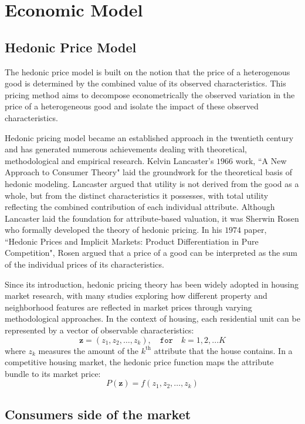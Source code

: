 \section*{Economic Model}
\subsection*{Hedonic Price Model}
The hedonic price model is built on the notion that the price of a heterogenous good is determined by the combined value of its observed characteristics. This pricing method aims to decompose econometrically the observed variation in the price of a heterogeneous good and isolate the impact of these observed characteristics.

Hedonic pricing model became an established approach in the twentieth century and has generated numerous achievements dealing with theoretical, methodological and empirical research. Kelvin Lancaster’s $1966$ work, ``A New Approach to Consumer Theory" laid the groundwork for the theoretical basis of hedonic modeling. Lancaster argued that utility is not derived from the good as a whole, but from the distinct characteristics it possesses, with total utility reflecting the combined contribution of each individual attribute. Although Lancaster laid the foundation for attribute-based valuation, it was Sherwin Rosen who formally developed the theory of hedonic pricing. In his $1974$ paper, ``Hedonic Prices and Implicit Markets: Product Differentiation in Pure Competition", Rosen argued that a price of a good can be interpreted as the sum of the individual prices of its characteristics. 

Since its introduction, hedonic pricing theory has been widely adopted in housing market research, with many studies exploring how different property and neighborhood features are reflected in market prices through varying methodological approaches.
In the context of housing, each residential unit can be represented by a vector of observable characteristics:
\[
\mathbf z=(z_{1},z_{2},\ldots,z_{k}), \quad \texttt{for} \quad k = 1, 2, ... K
\]
where $z_k$ measures the amount of the $k^{\text{th}}$ attribute that the house contains.
In a competitive housing market, the hedonic price function maps the attribute bundle to its market price:
\[
P(\mathbf z)=f(z_{1},z_{2},\ldots,z_{k})
\]

\subsection*{Consumers side of the market}

